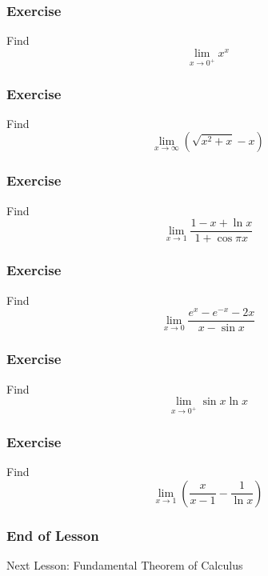 \documentclass[xcolor=dvipsnames]{beamer}
\begin{document}
\begin{frame}
  \frametitle{Exercise}
  {\ubung} Find
  \begin{equation}
    \label{eq:mahpeilu}
    \lim_{x\rightarrow{}0^{+}}x^{x}
  \end{equation}
\end{frame}

\begin{frame}
  \frametitle{Exercise}
  {\ubung} Find
  \begin{equation}
    \label{eq:eigahrai}
    \lim_{x\rightarrow\infty}(\sqrt{x^{2}+x}-x)
  \end{equation}
\end{frame}

\begin{frame}
  \frametitle{Exercise}
  {\ubung} Find
  \begin{equation}
    \label{eq:vuciecha}
    \lim_{x\rightarrow{}1}\frac{1-x+\ln{}x}{1+\cos\pi{}x}
  \end{equation}
\end{frame}

\begin{frame}
  \frametitle{Exercise}
  {\ubung} Find
  \begin{equation}
    \label{eq:taihahri}
    \lim_{x\rightarrow{}0}\frac{e^{x}-e^{-x}-2x}{x-\sin{}x}
  \end{equation}
\end{frame}

\begin{frame}
  \frametitle{Exercise}
  {\ubung} Find
  \begin{equation}
    \label{eq:eemeeyae}
    \lim_{x\rightarrow{}0^{+}}\sin{}x\ln{}x
  \end{equation}
\end{frame}

\begin{frame}
  \frametitle{Exercise}
  {\ubung} Find
  \begin{equation}
    \label{eq:gasuchoh}
    \lim_{x\rightarrow{}1}\left(\frac{x}{x-1}-\frac{1}{\ln{}x}\right)
  \end{equation}
\end{frame}

\begin{frame}
  \frametitle{End of Lesson}
Next Lesson: Fundamental Theorem of Calculus
\end{frame}
\end{document}
